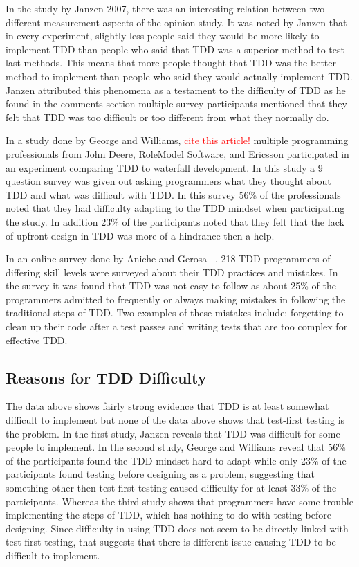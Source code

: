 \documentclass{sig-alternate}
\newcommand{\mycomment}[1]{\textcolor{red}{#1}}
\begin{document}
In the study by Janzen 2007, there was an interesting relation between two different measurement aspects of the opinion study.  It was noted by Janzen that in every experiment, slightly less people said they would be more likely to implement TDD than people who said that TDD was a superior method to test-last methods. This means that more people thought that TDD was the better method to implement than  people who said they would actually implement TDD.  Janzen attributed this phenomena as a testament to the difficulty of TDD as he found in the comments section multiple survey participants mentioned that they felt that TDD was too difficult or too different from what they normally do.

In a study done by George and Williams,  \mycomment{cite this article!} multiple programming professionals from John Deere, RoleModel Software, and Ericsson participated in an experiment comparing TDD to waterfall development.  In this study a 9 question survey was given out asking programmers what they thought about TDD and what was difficult with TDD.  In this survey 56\% of the professionals noted that they had difficulty adapting to the TDD mindset when participating the study.  In addition 23\% of the participants noted that they felt that the lack of upfront design in TDD was more of a hindrance then a help. 

In an online survey done by Aniche and Gerosa ~\cite{Aniche:2010}, 218 TDD programmers of differing skill levels were surveyed about their TDD practices and mistakes.  In the survey it was found that TDD was not easy to follow as about 25\% of the programmers admitted to frequently or always making mistakes in following the traditional steps of TDD.  Two examples of these mistakes include: forgetting to clean up their code after a test passes and writing tests that are too complex for effective TDD.
 
\subsection{Reasons for TDD Difficulty}
The data above shows fairly strong evidence that TDD is at least somewhat difficult to implement but none of the data above shows that test-first testing is the problem.  In the first study, Janzen reveals that TDD was difficult for some people to implement.  In the second study, George and Williams reveal that 56\% of the participants found the TDD mindset hard to adapt while only 23\% of the participants found testing before designing as a problem, suggesting that something other then test-first testing caused difficulty for at least 33\% of the participants.  Whereas the third study shows that programmers have some trouble implementing the steps of TDD, which has nothing to do with testing before designing.  Since difficulty in using TDD does not seem to be directly linked with test-first testing, that suggests that there is different issue causing TDD to be difficult to implement.
\end{document}
